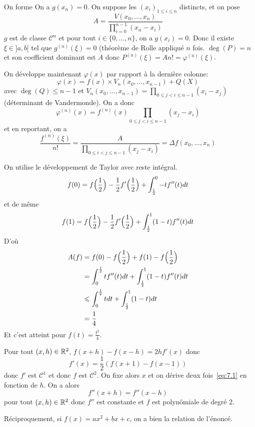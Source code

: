 \begin{solution}
	On forme 
	On a $g(x_{n})=0$. On suppose les $(x_{i})_{1\leqslant i\leqslant n}$ distincts, et on pose 
	$$A=\frac{V(x_{0},\dots,x_{n})}{\prod_{i=0}^{n-1}(x_{n}-x_{i})}$$
	$g$ est de classe $\mathcal{C}^{n}$ et pour tout $i\in\{0,\dots,n\}$, on a $g(x_{i})=0$.
	Donc il existe $\xi\in]a,b[$ tel que $g^{(n)}(\xi)=0$ (théorème de Rolle appliqué $n$ fois. $\deg(P)=n$ et son coefficient dominant est $A$ donc $P^{(n)}(\xi)=An!=\varphi^{(n)}(\xi)$.

	On développe maintenant $\varphi(x)$ par rapport à la dernière colonne:
	$$\varphi(x)=f(x)\times V_{n}(x_{0},\dots,x_{n-1})+Q(X)$$
	avec $\deg(Q)\leqslant n-1$ et $V_{n}(x_{0},\dots,x_{n-1})=\prod_{0\leqslant j<i\leqslant n-1}(x_{i}-x_{j})$ (déterminant de Vandermonde). On a donc 
	$$\varphi^{(n)}(x)=f^{(n)}(x)\prod_{0\leqslant j<i\leqslant n-1}(x_{j}-x_{i})$$
	et en reportant, on a 
	$$\frac{f^{(n)}(\xi)}{n!}=\frac{A}{\prod_{0\leqslant i<j\leqslant n-1}(x_{j}-x_{i})}=\Delta f(x_{0},\dots,x_{n})$$
\end{solution}

\begin{solution}
	On utilise le développement de Taylor avec reste intégral.
	$$f(0)=f\Bigl(\frac{1}{2}\Bigr)-\frac{1}{2}f'\Bigl(\frac{1}{2}\Bigr)+\int_{\frac{1}{2}}^{0}-tf''(t)dt$$
	et de même
	$$f(1)=f\Bigl(\frac{1}{2}\Bigr)-\frac{1}{2}f'\Bigl(\frac{1}{2}\Bigr)+\int_{\frac{1}{2}}^{1}(1-t)f''(t)dt$$
	D'où
	\begin{align*}
		A(f)
		&=f(0)-f\Bigl(\frac{1}{2}\Bigr)+f(1)-f\Bigl(\frac{1}{2}\Bigr)\\
		&=\int_{0}^{\frac{1}{2}}tf''(t)dt+\int_{\frac{1}{2}}^{1}(1-t)f''(t)dt\\
		&\leqslant\int_{0}^{\frac{1}{2}}tdt+\int_{\frac{1}{2}}^{1}(1-t)dt\\
		&=\frac{1}{4}
	\end{align*}
	Et c'est atteint pour $f(t)=\frac{t^{2}}{4}$.
\end{solution}

\begin{solution}
	Pour tout $(x,h)\in\mathbb{R}^{2}$, $f(x+h)-f(x-h)=2hf'(x)$ donc 
	\begin{equation}
		\label{eq:7.1}
		f'(x)=\frac{1}{2}(f(x+1)-f(x-1))
	\end{equation}
	donc $f'$ est $\mathcal{C}^{1}$ et donc $f$ est $\mathcal{C}^{2}$. On fixe alors $x$ et on dérive deux fois~\eqref{eq:7.1} en fonction de $h$. On a alors
	$$f''(x+h)=f''(x-h)$$
	pour tout $(x,h)\in\mathbb{R}^{2}$ donc $f''$ est constante et $f$ est polynômiale de degré 2.

	Réciproquement, si $f(x)=ax^{2}+bx+c$, on a bien la relation de l'énoncé.
\end{solution}


